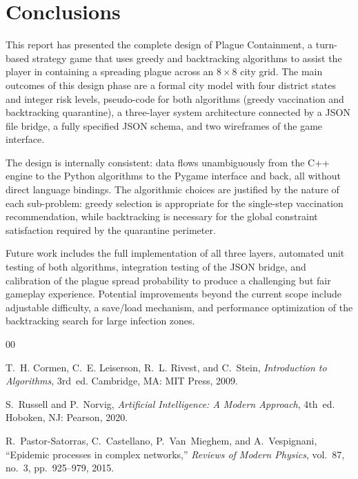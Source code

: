 \documentclass[12pt, a4paper]{article}
\begin{document}
\section{Conclusions}

This report has presented the complete design of Plague Containment, a
turn-based strategy game that uses greedy and backtracking algorithms to
assist the player in containing a spreading plague across an $8\times8$ city
grid. The main outcomes of this design phase are a formal city model with
four district states and integer risk levels, pseudo-code for both
algorithms (greedy vaccination and backtracking quarantine), a three-layer
system architecture connected by a JSON file bridge, a fully specified
JSON schema, and two wireframes of the game interface.

The design is internally consistent: data flows unambiguously from the C++
engine to the Python algorithms to the Pygame interface and back, all
without direct language bindings. The algorithmic choices are justified by
the nature of each sub-problem: greedy selection is appropriate for the
single-step vaccination recommendation, while backtracking is necessary for
the global constraint satisfaction required by the quarantine perimeter.

Future work includes the full implementation of all three layers, automated
unit testing of both algorithms, integration testing of the JSON bridge,
and calibration of the plague spread probability to produce a challenging
but fair gameplay experience. Potential improvements beyond the current
scope include adjustable difficulty, a save/load mechanism, and performance
optimization of the backtracking search for large infection zones.

\newpage
\begin{thebibliography}{00}

T.~H. Cormen, C.~E. Leiserson, R.~L. Rivest, and C.~Stein,
\textit{Introduction to Algorithms}, 3rd~ed.
Cambridge, MA: MIT Press, 2009.

S.~Russell and P.~Norvig,
\textit{Artificial Intelligence: A Modern Approach}, 4th~ed.
Hoboken, NJ: Pearson, 2020.

R.~Pastor-Satorras, C.~Castellano, P.~Van~Mieghem, and A.~Vespignani,
``Epidemic processes in complex networks,''
\textit{Reviews of Modern Physics}, vol.~87, no.~3, pp.~925--979, 2015.

\end{thebibliography}
\end{document}
